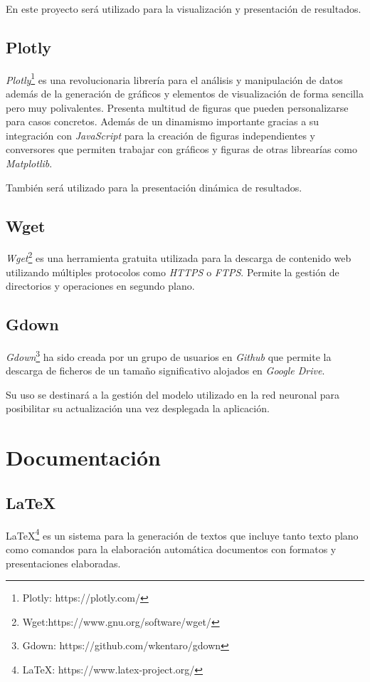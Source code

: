 En este proyecto será utilizado para la visualización y presentación de resultados.

\subsection{Plotly}
\emph{Plotly}\footnote{Plotly: https://plotly.com/} es una revolucionaria librería para el análisis y manipulación de datos además de la generación de gráficos y elementos de visualización de forma sencilla pero muy polivalentes. Presenta multitud de figuras que pueden personalizarse para casos concretos. 
Además de un dinamismo importante gracias a su integración con \emph{JavaScript} para la creación de figuras independientes y conversores que permiten trabajar con gráficos y figuras de otras librearías como \emph{Matplotlib}.

También será utilizado para la presentación dinámica de resultados.

\subsection{Wget}
\emph{Wget}\footnote{Wget:https://www.gnu.org/software/wget/} es una herramienta gratuita utilizada para la descarga de contenido web utilizando múltiples protocolos como \emph{HTTPS} o \emph{FTPS}. Permite la gestión de directorios y operaciones en segundo plano.

\subsection{Gdown}
\emph{Gdown}\footnote{Gdown: https://github.com/wkentaro/gdown} ha sido creada por un grupo de usuarios en \emph{Github} que permite la descarga de ficheros de un tamaño significativo alojados en \emph{Google Drive}.

Su uso se destinará a la gestión del modelo utilizado en la red neuronal para posibilitar su actualización una vez desplegada la aplicación.

\section{Documentación}

\subsection{\LaTeX}
\LaTeX\footnote{\LaTeX: https://www.latex-project.org/} es un sistema para la generación de textos que incluye tanto texto plano como comandos para la elaboración automática documentos con formatos y presentaciones elaboradas.

